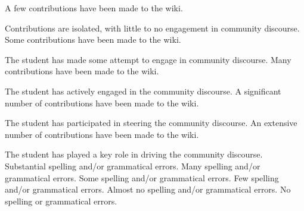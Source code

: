 \documentclass{../../fal_assignment}
\begin{document}
\begin{markingrubric}
        \grade 		A few contributions have been made to the wiki.
				\par		Contributions are isolated, with little to no engagement in community discourse.
        \grade 		Some contributions have been made to the wiki.
        \par		The student has made some attempt to engage in community discourse.
        \grade 		Many contributions have been made to the wiki.
        \par		The student has actively engaged in the community discourse.
        \grade 		A significant number of contributions have been made to the wiki.
        \par		The student has participated in steering the community discourse.
        \grade 		An extensive number of contributions have been made to the wiki.
        \par		The student has played a key role in driving the community discourse.
%
        \grade\fail 	Substantial spelling and/or grammatical errors.
        \grade 		Many spelling and/or grammatical errors.
        \grade 		Some spelling and/or grammatical errors.  
        \grade 		Few spelling and/or grammatical errors.
        \grade 		Almost no spelling and/or grammatical errors.
        \grade 		No spelling or grammatical errors.
\end{markingrubric}
\end{document}
